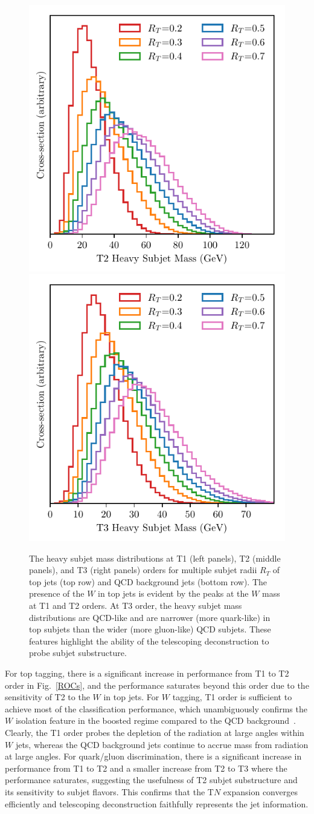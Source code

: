 \documentclass[notoc]{JHEP3}
\DeclareRobustCommand{\Fig}[1]{Fig.~\ref{#1}}
\begin{document}
\begin{figure}[h]
\includegraphics[width=.32\columnwidth]{figures/T2HeavyMass_qcd.pdf}
\includegraphics[width=.32\columnwidth]{figures/T3HeavyMass_qcd.pdf}
\caption{\label{masses}The heavy subjet mass distributions at T1 (left panels), T2 (middle panels), and T3 (right panels) orders for multiple subjet radii $R_T$ of top jets (top row) and QCD background jets (bottom row). The presence of the $W$ in top jets is evident by the peaks at the $W$ mass at T1 and T2 orders. At T3 order, the heavy subjet mass distributions are QCD-like and are narrower (more quark-like) in %
top subjets than the wider (more gluon-like) QCD subjets. These features highlight the ability of the telescoping deconstruction to probe subjet substructure.}
\end{figure}

For top tagging, there is a significant increase in performance from T1 to T2 order in \Fig{ROCs}, and the performance saturates beyond this order due to the sensitivity of T2 to the $W$ in top jets. For $W$ tagging, T1 order is sufficient to achieve most of the classification performance, which unambiguously confirms the $W$ isolation feature in the boosted regime compared to the QCD background~\cite{Chien:2017xrb}. Clearly, the T1 order probes the depletion of the radiation at large angles within $W$ jets, whereas the QCD background jets continue to accrue mass from radiation at large angles. For quark/gluon discrimination, there is a significant increase in performance from T1 to T2 and a smaller increase from T2 to T3 where the performance saturates, suggesting the usefulness of T2 subjet substructure and its sensitivity to subjet flavors. This confirms that the T$N$ expansion converges efficiently and telescoping deconstruction faithfully represents the jet information.
\end{document}
